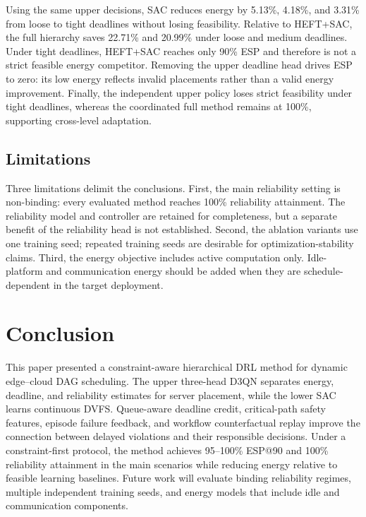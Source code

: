 \documentclass[lettersize,journal]{IEEEtran}
\begin{document}
Using the same upper decisions, SAC reduces energy by 5.13\%, 4.18\%, and
3.31\% from loose to tight deadlines without losing feasibility. Relative to
HEFT+SAC, the full hierarchy saves 22.71\% and 20.99\% under loose and medium
deadlines. Under tight deadlines, HEFT+SAC reaches only 90\% ESP and therefore
is not a strict feasible energy competitor. Removing the upper deadline head
drives ESP to zero: its low energy reflects invalid placements rather than a
valid energy improvement. Finally, the independent upper policy loses strict
feasibility under tight deadlines, whereas the coordinated full method remains
at 100\%, supporting cross-level adaptation.

\subsection{Limitations}
Three limitations delimit the conclusions. First, the main reliability setting
is non-binding: every evaluated method reaches 100\% reliability attainment.
The reliability model and controller are retained for completeness, but a
separate benefit of the reliability head is not established. Second, the
ablation variants use one training seed; repeated training seeds are desirable
for optimization-stability claims. Third, the energy objective includes active
computation only. Idle-platform and communication energy should be added when
they are schedule-dependent in the target deployment.

\section{Conclusion}
\label{sec:conclusion}
This paper presented a constraint-aware hierarchical DRL method for dynamic
edge--cloud DAG scheduling. The upper three-head D3QN separates energy,
deadline, and reliability estimates for server placement, while the lower SAC
learns continuous DVFS. Queue-aware deadline credit, critical-path safety
features, episode failure feedback, and workflow counterfactual replay improve
the connection between delayed violations and their responsible decisions.
Under a constraint-first protocol, the method achieves 95--100\% ESP@90 and
100\% reliability attainment in the main scenarios while reducing energy
relative to feasible learning baselines. Future work will evaluate binding
reliability regimes, multiple independent training seeds, and energy models
that include idle and communication components.



\end{document}
